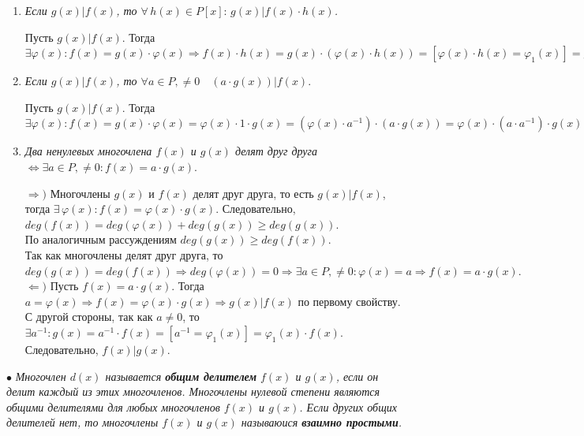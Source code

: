 \begin{enumerate}
\begin{Proof}
	\end{Proof}
	\item \textit{Если $g(x)|f(x)$, то $\forall \, h(x) \in P[x]: \, g(x)|f(x)\cdot h(x)$.}
	\begin{Proof} 
		Пусть $g(x)|f(x)$. Тогда $\exists \varphi(x): f(x) = g(x)\cdot\varphi(x) \Rightarrow f(x)\cdot h(x) = g(x)\cdot (\varphi(x)\cdot h(x)) = [\varphi(x)\cdot h(x) = \varphi_1(x)] = g(x)\cdot\varphi_1(x) \Rightarrow g(x)|f(x)\cdot h(x).$ 
	\end{Proof}
	\item \textit{Если $g(x)|f(x)$, то $\forall a \in P,\ne 0\quad (a\cdot g(x))|f(x).$}
	\begin{Proof} 
		Пусть $g(x)|f(x)$. Тогда $\exists \varphi(x):  f(x) = g(x)\cdot\varphi(x) = \varphi(x)\cdot1\cdot g(x) = (\varphi(x)\cdot a^{-1})\cdot (a\cdot g(x)) = \varphi(x)\cdot (a\cdot a^{-1})\cdot g(x) = [\varphi(x)\cdot a^{-1} = \varphi_1(x)] = \varphi_1(x)\cdot(a\cdot g(x)) \Rightarrow (a\cdot g(x))|f(x).$ 
	\end{Proof}
	\item \textit{Два ненулевых многочлена $f(x)$ и $g(x)$ делят друг друга $\Longleftrightarrow \exists a \in P, \ne 0: f(x) = a\cdot g(x).$}
	\begin{Proof} 
		$\Rightarrow)$ Многочлены $g(x)$ и $f(x)$ делят друг друга, то есть $g(x)|f(x)$, тогда $\exists \, \varphi(x): f(x) = \varphi(x)\cdot g(x)$. Следовательно, $deg(f(x)) = deg(\varphi(x)) + 
		deg(g(x)) \geqslant deg(g(x)).$\\ По аналогичным рассуждениям $deg(g(x)) \geqslant deg(f(x))$.\\ 
		Так как многочлены делят друг друга, то $deg(g(x)) = deg(f(x)) \Rightarrow deg(\varphi(x)) = 0 \Rightarrow \exists a \in P, \ne 0: \varphi(x) = a \Rightarrow f(x) = a\cdot g(x).$\\
		$\Leftarrow)$ Пусть $f(x) = a\cdot g(x)$. Тогда $a = \varphi(x) \Longrightarrow f(x) = \varphi(x)\cdot g(x) \Rightarrow g(x)|f(x)$ по первому свойству.\\
		С другой стороны, так как $a \not= 0$, то $\exists a^{-1}: g(x) = a^{-1}\cdot f(x) = [a^{-1} = \varphi_1(x)] = \varphi_1(x)\cdot f(x)$. Следовательно, $f(x)|g(x).$
	\end{Proof}
\end{enumerate}
$\bullet$ \textit{Многочлен $d(x)$ называется \textbf{общим делителем} $f(x)$ и $g(x)$, если он делит каждый из 
	этих многочленов. Многочлены нулевой степени являются общими делителями для любых многочленов $f(x)$ и $g(x)$. Если других общих делителей нет, то многочлены $f(x)$ и $g(x)$ называюися \textbf{взаимно простыми}.}\\\\
